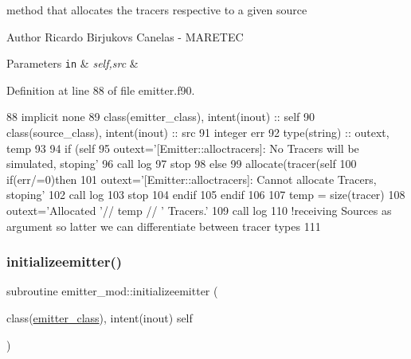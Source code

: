 method that allocates the tracers respective to a given source 

\begin{DoxyAuthor}{Author}
Ricardo Birjukovs Canelas -\/ M\+A\+R\+E\+T\+EC
\end{DoxyAuthor}

\begin{DoxyParams}[1]{Parameters}
\mbox{\tt in}  & {\em self,src} & \\
\hline
\end{DoxyParams}


Definition at line 88 of file emitter.\+f90.


\begin{DoxyCode}
88     \textcolor{keywordtype}{implicit none}
89     \textcolor{keywordtype}{class}(emitter\_class), \textcolor{keywordtype}{intent(inout)} :: self
90     \textcolor{keywordtype}{class}(source\_class), \textcolor{keywordtype}{intent(inout)} :: src
91     \textcolor{keywordtype}{integer} err
92     \textcolor{keywordtype}{type}(string) :: outext, temp
93 
94     \textcolor{keywordflow}{if} (self%
95         outext=\textcolor{stringliteral}{'[Emitter::alloctracers]: No Tracers will be simulated, stoping'}
96         \textcolor{keyword}{call }log%
97         stop
98     \textcolor{keywordflow}{else}
99         \textcolor{keyword}{allocate}(tracer(self%
100         \textcolor{keywordflow}{if}(err/=0)\textcolor{keywordflow}{then}
101             outext=\textcolor{stringliteral}{'[Emitter::alloctracers]: Cannot allocate Tracers, stoping'}
102             \textcolor{keyword}{call }log%
103             stop
104 \textcolor{keywordflow}{        endif}
105 \textcolor{keywordflow}{    endif}
106 
107     temp = \textcolor{keyword}{size}(tracer)
108     outext=\textcolor{stringliteral}{'Allocated '}// temp // \textcolor{stringliteral}{' Tracers.'}
109     \textcolor{keyword}{call }log%
110     \textcolor{comment}{!receiving Sources as argument so latter we can differentiate between tracer types}
111 
\end{DoxyCode}
\mbox{\label{namespaceemitter__mod_a6376ad0f8e1739b29caf672aa0750373}} 
\subsubsection{\texorpdfstring{initializeemitter()}{initializeemitter()}}
{\footnotesize\ttfamily subroutine emitter\+\_\+mod\+::initializeemitter (\begin{DoxyParamCaption}\item[{class(\mbox{\hyperlink{structemitter__mod_1_1emitter__class}{emitter\+\_\+class}}), intent(inout)}]{self }\end{DoxyParamCaption})\hspace{0.3cm}{\ttfamily [private]}}



